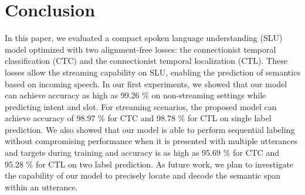 \documentclass[a4paper]{article}
\begin{document}
\section{Conclusion}
\label{sec:conclusion}

In this paper, we evaluated a compact spoken language understanding (SLU) model optimized with two alignment-free losses: the connectionist temporal classification (CTC) and the connectionist temporal localization (CTL). These losses allow the streaming capability on SLU, enabling the prediction of semantics based on incoming speech. In our first experiments, we showed that our model can achieve accuracy as high as 99.26 \% on non-streaming settings while predicting intent and slot. For streaming scenarios, the proposed model can achieve accuracy of 98.97 \% for CTC and 98.78 \% for CTL on single label prediction. We also showed that our model is able to perform sequential labeling without compromising performance when it is presented with multiple utterances and targets during training and accuracy is as high as 95.69 \% for CTC and 95.28 \% for CTL on two label prediction. As future work, we plan to investigate the capability of our model to precisely locate and decode the semantic span within an utterance.

\newpage




\end{document}
